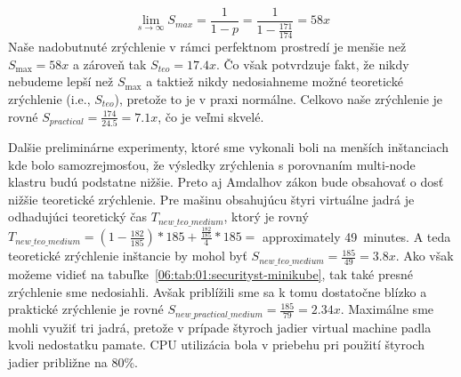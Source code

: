 \begin{equation}
    \label{eqn:amdalh-limit}
    \lim_{s\to\infty} S_{max} = \frac{1}{1-p} =  \frac{1}{1-\frac{171}{174}} = 58x
    \tag{8}
\end{equation}
Naše nadobutnuté zrýchlenie v rámci perfektnom prostredí je menšie než $S_{\max} = 58x$ a zároveň tak $S_{teo} = 17.4x$.
Čo však potvrdzuje fakt, že nikdy nebudeme lepší než $S_{\max}$ a taktiež nikdy nedosiahneme možné teoretické zrýchlenie (i.e., $S_{teo}$),
pretože to je v praxi normálne. Celkovo naše zrýchlenie je rovné $S_{practical} = \frac{174}{24.5} =7.1x$, čo je veľmi skvelé.

Dalšie preliminárne experimenty, ktoré sme vykonali boli na menších inštanciach kde bolo samozrejmosťou, že výsledky
zrýchlenia s porovnaním multi-node klastru budú podstatne nižšie.
Preto aj Amdalhov zákon bude obsahovať o dosť nižšie teoretické zrýchlenie. Pre mašinu obsahujúcu štyri virtuálne jadrá je
odhadujúci teoretický čas $T_{new\_teo\_medium}$, ktorý je rovný $T_{new\_teo\_medium} = (1 - \frac{182}{185}) * 185 +  \frac{ \frac{182}{185}}{4} * 185 = $ approximately 49~minutes.
A teda teoretické zrýchlenie inštancie by mohol byť $S_{new\_teo\_medium} = \frac{185}{49} = 3.8x$.
Ako však možeme vidieť na tabuľke~\ref{06:tab:01:securityst-minikube}, tak také presné zrýchlenie sme nedosiahli.
Avšak priblížili sme sa k tomu dostatočne blízko a praktické zrýchlenie je rovné $S_{new\_practical\_medium} = \frac{185}{79} = 2.34x$.
Maximálne sme mohli využiť tri jadrá, pretože v prípade štyroch jadier virtual machine padla kvoli nedostatku pamate.
CPU utilizácia bola v priebehu pri použití štyroch jadier približne na 80\%.

